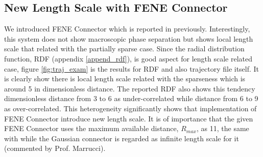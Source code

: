 \documentclass[10pt, a4paper]{report}
\begin{document}
\subsection{New Length Scale with FENE Connector}
We introduced FENE Connector which is reported in previously. Interestingly, this system does not show macroscopic phase separation but shows local length scale that related with the partially sparse case. Since the radial distribution function, RDF (appendix \ref{append_rdf}), is good aspect for length scale related case, figure \ref{fig:traj_exam} is the results for RDF and also trajectory file itself. It is clearly show there is local length scale related with the sparseness which is around 5 in dimensionless distance. The reported RDF also shows this tendency dimensionless distance from 3 to 6 as under-correlated while distance from 6 to 9 as over-correlated. This heterogeneity significantly shows that implementation of FENE Connector introduce new length scale. It is of importance that the given FENE Connector uses the maximum available distance, $R_{max}$, as 11, the same with \textcite{Ianniruberto:2015dv} while the Gaussian connector is regarded as infinite length scale for it (commented by Prof. Marrucci).
\end{document}

